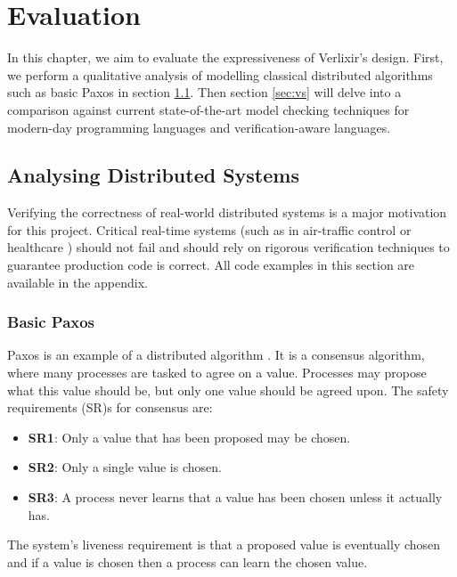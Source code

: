 \chapter{Evaluation} \label{chap:eval}
In this chapter, we aim to evaluate the expressiveness of Verlixir's design. First, we perform a qualitative analysis of modelling classical distributed algorithms such as basic Paxos in section \ref{sec:ds}. Then section \ref{sec:vs} will delve into a comparison against current state-of-the-art model checking techniques for modern-day programming languages and verification-aware languages.
\section{Analysing Distributed Systems} \label{sec:ds}
Verifying the correctness of real-world distributed systems is a major motivation for this project. Critical real-time systems (such as in air-traffic control or healthcare  \cite{airlines,healthcare}) should not fail and should rely on rigorous verification techniques to guarantee production code is correct. All code examples in this section are available in the appendix.  
\subsection{Basic Paxos} \label{sec:Paxos}
Paxos is an example of a distributed algorithm \cite{paxos_simple}. It is a consensus algorithm, where many processes are tasked to agree on a value. Processes may propose what this value should be, but only one value should be agreed upon. The safety requirements (SR)s for consensus are:
\begin{itemize}
    \item \textbf{SR1}: Only a value that has been proposed may be chosen.
    \item \textbf{SR2}: Only a single value is chosen.
    \item \textbf{SR3}: A process never learns that a value has been chosen unless it actually has.
\end{itemize}
The system's liveness requirement is that a proposed value is eventually chosen and if a value is chosen then a process can learn the chosen value.
